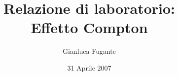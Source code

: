 \documentclass[a4paper,12pt,twoside]{book}
\begin{document}
  
	\title{Relazione di laboratorio:\\Effetto Compton}				%
	\author{Gianluca Fugante}
	\date{31 Aprile 2007}
	
	\maketitle
\end{document}
